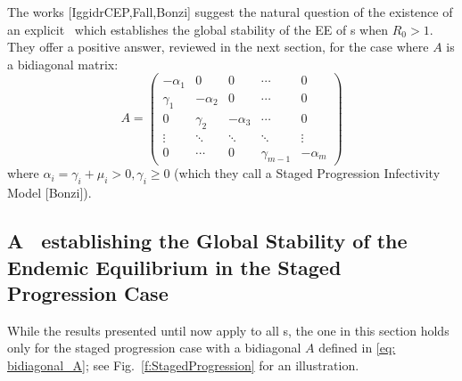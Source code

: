  \iffalse
\BEN

\im The Jacobian is: \be{JF}J(X)=J(\x,\y)=\bep \ba \y^t \bbe + A&|&\ba\pr{ \bbe \x }^t\\\hline \\ -\diag(\y) \bbe&|& A_S -\diag( \bbe \x )\eep\ee

\im The determinant of the Jacobian at the DFE is $$\dd=det(\ba \y_0^t \bbe + A) det(A_S), \y_0=(-A_S)^{-1}\Lambda.$$

\im Lyapunov functions allowing to prove the GAS property of the two fixed points are also available-- see next section.
\EEN
\fi

 The works [IggidrCEP,Fall,Bonzi] suggest the natural question of the existence of an explicit \Lf\ which establishes the global stability of the EE of \ABa s when $R_0> 1$. They offer a positive answer, reviewed in the next section, for the case where $A$ is a bidiagonal matrix:
\begin{equation} \label{eq: bidiagonal_A}
A = \begin{pmatrix}
-\alpha_1 & 0 & 0 & \cdots & 0 \\
\gamma_1 & -\alpha_2 & 0 & \cdots & 0 \\
0 & \gamma_2 & -\alpha_3 & \cdots & 0 \\
\vdots & \ddots & \ddots & \ddots & \vdots \\
0 & \cdots & 0 & \gamma_{m-1} & -\alpha_m
\end{pmatrix}
\end{equation}
where $\alpha_i = \gamma_{i} + \mu_{i} > 0, \gamma_i \geq 0$ (which they call a Staged Progression Infectivity Model [Bonzi]).


\subsection{A \Lf\ establishing the Global Stability of the Endemic Equilibrium in the Staged Progression Case}
While the results presented until now apply to all \ABP s, the one in this section holds only for the staged progression case with a bidiagonal $A$ defined in \eqref{eq: bidiagonal_A}; see Fig.~\ref{f:StagedProgression} for an illustration.


